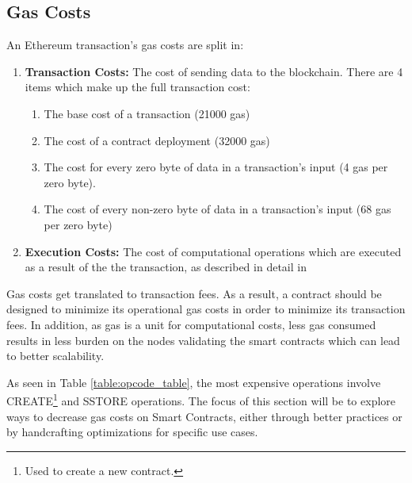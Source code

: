 \subsection{Gas Costs}
An Ethereum transaction's gas costs are split in: %
\begin{enumerate}
    \item \textbf{Transaction Costs:} The cost of sending data to the blockchain. There are 4 items which make up the full transaction cost:
        \begin{enumerate}
            \item The base cost of a transaction (21000 gas)
            \item The cost of a contract deployment (32000 gas)
            \item The cost for every zero byte of data in a transaction's input (4 gas per zero byte).
            \item The cost of every non-zero byte of data in a transaction's input (68 gas per zero byte)
        \end{enumerate}
    \item \textbf{Execution Costs:} The cost of computational operations which are executed as a result of the the transaction, as described in detail in \cite{ethereum, gas} 
\end{enumerate} 

Gas costs get translated to transaction fees. As a result, a contract should be designed to minimize its operational gas costs in order to minimize its transaction fees. In addition, as gas is a unit for computational costs, less gas consumed results in less burden on the nodes validating the smart contracts which can lead to better scalability.




As seen in Table \ref{table:opcode_table}, the most expensive operations involve CREATE\footnote{Used to create a new contract.} and SSTORE operations. The focus of this section will be to explore ways to decrease gas costs on Smart Contracts, either through better practices or by handcrafting optimizations for specific use cases.

